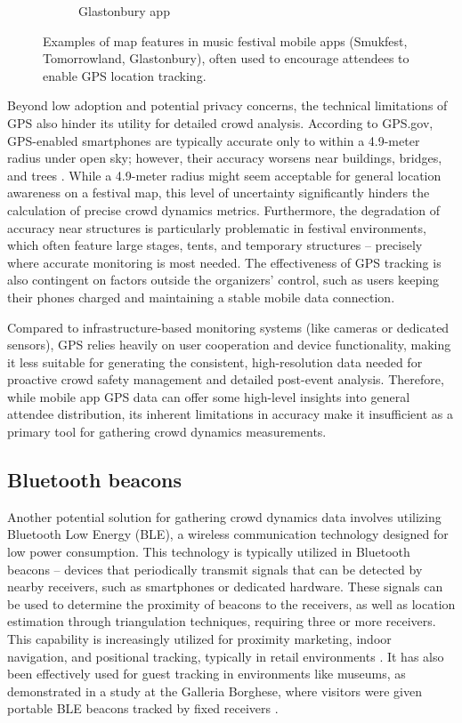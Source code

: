 \begin{figure}
\begin{subfigure}{.3\textwidth}
    \caption{Glastonbury app \cite{glastonbury_app}}
    \label{fig:glastonbury_app}
  \end{subfigure}
  \caption{Examples of map features in music festival mobile apps (Smukfest, Tomorrowland, Glastonbury), often used to encourage attendees to enable GPS location tracking.}
  \label{fig:festival_apps}
\end{figure}


Beyond low adoption and potential privacy concerns, the technical limitations of GPS also hinder its utility for detailed crowd analysis. According to GPS.gov, GPS-enabled smartphones are typically accurate only to within a 4.9-meter radius under open sky; however, their accuracy worsens near buildings, bridges, and trees \cite{gps}. While a 4.9-meter radius might seem acceptable for general location awareness on a festival map, this level of uncertainty significantly hinders the calculation of precise crowd dynamics metrics. Furthermore, the degradation of accuracy near structures is particularly problematic in festival environments, which often feature large stages, tents, and temporary structures -- precisely where accurate monitoring is most needed. The effectiveness of GPS tracking is also contingent on factors outside the organizers' control, such as users keeping their phones charged and maintaining a stable mobile data connection.

Compared to infrastructure-based monitoring systems (like cameras or dedicated sensors), GPS relies heavily on user cooperation and device functionality, making it less suitable for generating the consistent, high-resolution data needed for proactive crowd safety management and detailed post-event analysis. Therefore, while mobile app GPS data can offer some high-level insights into general attendee distribution, its inherent limitations in accuracy make it insufficient as a primary tool for gathering crowd dynamics measurements.

\subsection{Bluetooth beacons}
Another potential solution for gathering crowd dynamics data involves utilizing Bluetooth Low Energy (BLE), a wireless communication technology designed for low power consumption. This technology is typically utilized in Bluetooth beacons -- devices that periodically transmit signals that can be detected by nearby receivers, such as smartphones or dedicated hardware. These signals can be used to determine the proximity of beacons to the receivers, as well as location estimation through triangulation techniques, requiring three or more receivers. This capability is increasingly utilized for proximity marketing, indoor navigation, and positional tracking, typically in retail environments \cite{bt_beacon}. It has also been effectively used for guest tracking in environments like museums, as demonstrated in a study at the Galleria Borghese, where visitors were given portable BLE beacons tracked by fixed receivers \cite{borghese}.

